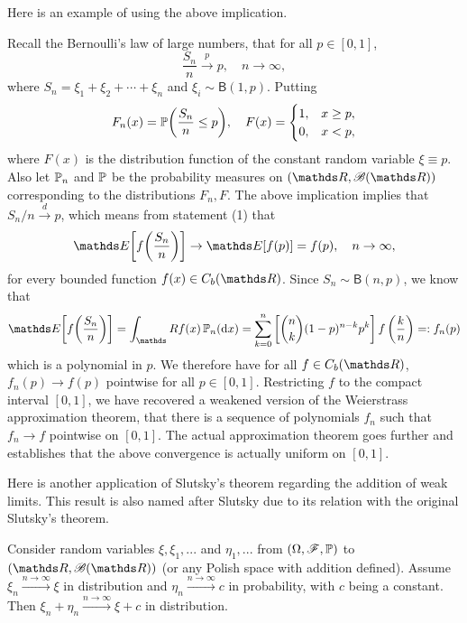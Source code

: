 Here is an example of using the above implication. 
\begin{example}
Recall the Bernoulli's law of large numbers, that for all $p \in [0,1]$,
\begin{equation*}
    \frac{S_n}{n} \xrightarrow{p} p, \quad n \to \infty,
\end{equation*}
where $S_n = \xi_1 + \xi_2 + \cdots + \xi_n$ and $\xi_i \sim \mathsf{B}(1,p)$. Putting
\begin{equation*}
    F_n(x) = \mathbb{P} \bigg(\frac{S_n}{n} \le p \bigg), \quad F(x) = 
    \begin{cases}
    1, & x \ge p,\\
    0, & x<p,
    \end{cases}
\end{equation*}
where $F(x)$ is the distribution function of the constant random variable $\xi \equiv p$. Also let $\mathbb{P}_n$ and $\mathbb{P}$ be the probability measures on $(\R, \B(\R))$ corresponding to the distributions $F_n, F$. The above implication implies that $S_n/n \xrightarrow{d} p$, which means from statement (1) that
\begin{equation*}
    \E\bigg[f\bigg(\frac{S_n}{n} \bigg) \bigg] \to \E[f(p)] = f(p), \quad n \to \infty,
\end{equation*}
for every bounded function $f(x) \in C_b(\R)$. Since $S_n \sim \mathsf{B}(n,p)$, we know that
\begin{equation*}
    \E\bigg[f\bigg(\frac{S_n}{n} \bigg) \bigg] = \int_\R f(x) \, \p_n(\d x) = \sum_{k=0}^n \sqbracket{{n \choose k}(1-p)^{n-k} p^k} f\bracket{\frac{k}{n}} =: f_n(p)
\end{equation*}
which is a polynomial in $p$. We therefore have for all $f \in C_b(\R)$, $f_n(p) \to f(p)$ pointwise for all $p \in [0,1]$. Restricting $f$ to the compact interval $[0,1]$, we have recovered a weakened version of the Weierstrass approximation theorem, that there is a sequence of polynomials $f_n$ such that $f_n \to f$ pointwise on $[0,1]$. The actual approximation theorem goes further and establishes that the above convergence is actually uniform on $[0,1]$.
\end{example}

Here is another application of Slutsky's theorem regarding the addition of weak limits. This result is also named after Slutsky due to its relation with the original Slutsky's theorem.
\begin{proposition} \label{prop:addition_of_weak_limits}
Consider random variables $\xi, \xi_1,...$ and $\eta_1,...$ from $(\Omega,\mathcal{F},\mathbb{P})$ to $(\R,\B(\R))$ (or any Polish space with addition defined). Assume $\xi_n \overset{n\to\infty}{\to} \xi$ in distribution and $\eta_n \overset{n\to\infty}{\to} c$ in probability, with $c$ being a constant. Then $\xi_n + \eta_n \overset{n\to\infty}{\to} \xi + c$ in distribution.
\end{proposition}

